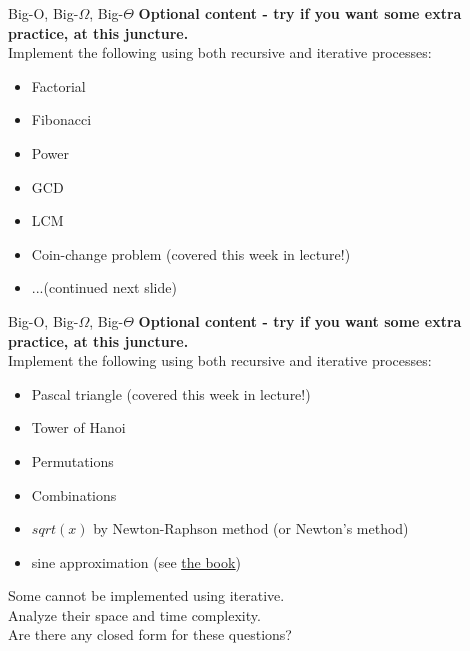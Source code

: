 \documentclass[10pt]{beamer}
\begin{document}
\begin{frame}[fragile]{Big-O, Big-$\Omega$, Big-$\Theta$}
\textbf{Optional content - try if you want some extra practice, at this juncture.} \\
Implement the following using both recursive and iterative processes:
\begin{itemize}
  \item Factorial
  \item Fibonacci
  \item Power
  \item GCD
  \item LCM
  \item Coin-change problem (covered this week in lecture!)
  \item ...(continued next slide)
\end{itemize}
\end{frame}


\begin{frame}[fragile]{Big-O, Big-$\Omega$, Big-$\Theta$}
\textbf{Optional content - try if you want some extra practice, at this juncture.} \\
Implement the following using both recursive and iterative processes:
\begin{itemize}
  \item Pascal triangle (covered this week in lecture!)
  \item Tower of Hanoi
  \item Permutations
  \item Combinations
  \item $sqrt(x)$ by Newton-Raphson method (or Newton's method)
  \item sine approximation (see \href{https://source-academy.github.io/sicp/chapters/1.2.3.html}{\underline{the book}})
\end{itemize}
Some cannot be implemented using iterative. \\
Analyze their space and time complexity. \\
Are there any closed form for these questions?
\end{frame}
\end{document}
